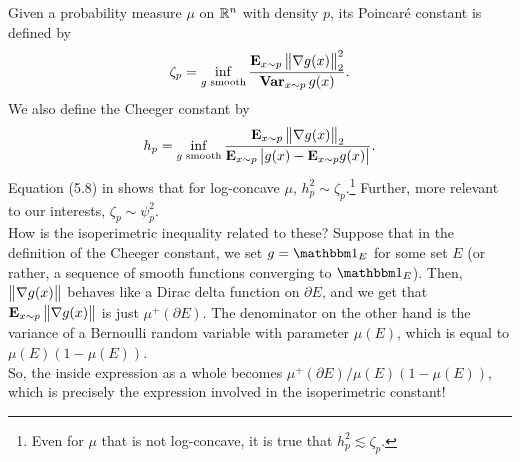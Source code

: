 \documentclass{article}
\begin{document}
		Given a probability measure $\mu$ on $\mathbb{R}^n$ with density $p$, its Poincar\'{e} constant is defined by
		\[ \zeta_p = \inf_{g\text{ smooth}} \frac{\textbf{E}_{x \sim p} \left\lVert\nabla g(x)\right\rVert_2^2}{\operatorname{\textbf{Var}}_{x \sim p} g(x)}. \]
		We also define the Cheeger constant by
		\[ h_p = \inf_{g\text{ smooth}} \frac{\textbf{E}_{x \sim p} \left\lVert\nabla g(x)\right\rVert_2}{\textbf{E}_{x \sim p} \left| g(x) - \textbf{E}_{x \sim p} g(x) \right|}. \]
		Equation (5.8) in \cite{LedouxCheegerPoincareConstant} shows that for log-concave $\mu$, $h_p^2 \sim \zeta_p$.\footnote{Even for $\mu$ that is not log-concave, it is true that $h_p^2 \lesssim \zeta_p$.} Further, more relevant to our interests, $\zeta_p \sim \psi_p^2$.\\
		How is the isoperimetric inequality related to these? Suppose that in the definition of the Cheeger constant, we set $g = \indic_E$ for some set $E$ (or rather, a sequence of smooth functions converging to $\indic_E$). Then, $\left\lVert\nabla g(x)\right\rVert$ behaves like a Dirac delta function on $\partial E$, and we get that $\textbf{E}_{x \sim p} \left\lVert\nabla g(x)\right\rVert$ is just $\mu^+(\partial E)$. The denominator on the other hand is the variance of a Bernoulli random variable with parameter $\mu(E)$, which is equal to $\mu(E)(1 - \mu(E))$.\\
		So, the inside expression as a whole becomes $\mu^+(\partial E) / \mu(E) ( 1 - \mu(E) )$, which is precisely the expression involved in the isoperimetric constant!




\end{document}

